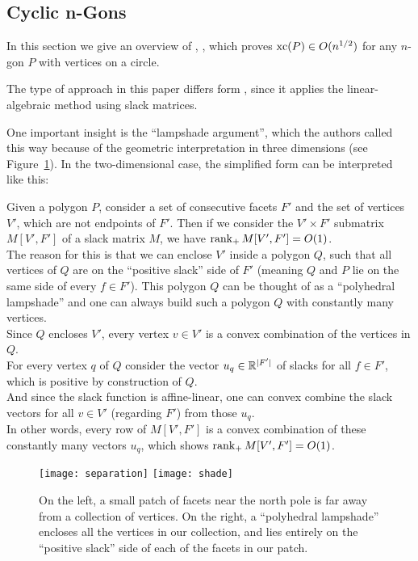 \subsection{Cyclic n-Gons}

In this section we give an overview of , \textcite{kwan2020extension}, which proves $\operatorname{xc}(P) \in O(n^{1/2})$ for any $n$-gon $P$ with vertices on a circle.

The type of approach in this paper differs form \textcite{shitov2020sublinear}, since it applies the linear-algebraic method using slack matrices.

One important insight is the ``lampshade argument'', which the authors called this way because of the geometric interpretation in three dimensions (see Figure~\ref{fig:lampshade}). In the two-dimensional case, the simplified form can be interpreted like this:

Given a polygon $P$, consider a set of consecutive facets $F'$ and the set of vertices $V'$, which are not endpoints of $F'$. Then if we consider the $V' \times F'$ submatrix $M[V',F']$ of a slack matrix $M$, we have $\operatorname{rank}_+ M[V',F'] = O(1)$.\\
The reason for this is that we can enclose $V'$ inside a polygon $Q$, such that all vertices of $Q$ are on the ``positive slack'' side of $F'$ (meaning $Q$ and $P$ lie on the same side of every $f \in F'$). This polygon $Q$ can be thought of as a ``polyhedral lampshade'' and one can always build such a polygon $Q$ with constantly many vertices.\\
Since $Q$ encloses $V'$, every vertex $v \in V'$ is a convex combination of the vertices in $Q$.\\
For every vertex $q$ of $Q$ consider the vector $u_q \in \mathbb{R}^{\lvert F'\rvert}$ of slacks for all $f \in F'$, which is positive by construction of $Q$.\\
And since the slack function is affine-linear, one can convex combine the slack vectors for all $v \in V'$ (regarding $F'$) from those $u_q$.\\
In other words, every row of $M[V',F']$ is a convex combination of these constantly many vectors $u_q$, which shows $\operatorname{rank}_+ M[V',F'] = O(1)$.

\begin{figure}[t]
  \centering
  \texttt{[image: separation]}
  \texttt{[image: shade]}
  \caption{On the left, a small patch of facets near the north pole is far away from a collection of vertices. On the right, a ``polyhedral lampshade'' encloses all the vertices in our collection, and lies entirely on the ``positive slack'' side of each of the facets in our patch. \cite[Figure~2]{kwan2020extension}}
  \label{fig:lampshade}
\end{figure}

